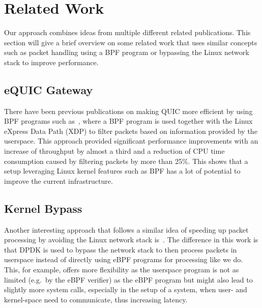 \section{Related Work}\label{sec:related_work}

Our approach combines ideas from multiple different 
related publications.
This section will give a brief overview on some related work 
that uses similar concepts such as packet handling using a BPF 
program or bypassing the Linux network stack to improve performance.

\subsection{eQUIC Gateway}
There have been previous publications on making QUIC more efficient by using BPF programs
such as~\parencite{equic-gateway}, where a BPF program is used together with the Linux
eXpress Data Path (XDP) to filter packets based on information provided by the userspace.
This approach provided significant performance improvements with an increase of throughput
by almost a third and a reduction of CPU time consumption caused by filtering packets by
more than 25\%.
This shows that a setup leveraging Linux kernel features such as BPF has a lot of potential
to improve the current infrastructure.

\subsection{Kernel Bypass}
Another interesting approach that follows a similar idea of speeding up packet processing
by avoiding the Linux network stack is~\parencite{kernel-bypass-msc-thesis}.
The difference in this work is that DPDK is used to bypass the network stack to 
then process packets in userspace instead of directly using eBPF programs for processing 
like we do.
This, for example, offers more flexibility as the userspace program is not as limited (e.g.\ 
by the eBPF verifier) as the eBPF program but might also lead to slightly more system calls,
especially in the setup of a system, when user- and kernel-space need to communicate, thus 
increasing latency.

